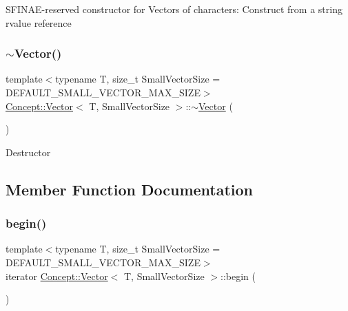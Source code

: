 S\+F\+I\+N\+A\+E-\/reserved constructor for Vectors of characters\+: Construct from a string rvalue reference \mbox{\label{class_concept_1_1_vector_a196f6eef1b0d3c04955d71d597e37c6f}} 
\subsubsection{\texorpdfstring{$\sim$Vector()}{~Vector()}}
{\footnotesize\ttfamily template$<$typename T, size\+\_\+t Small\+Vector\+Size = D\+E\+F\+A\+U\+L\+T\+\_\+\+S\+M\+A\+L\+L\+\_\+\+V\+E\+C\+T\+O\+R\+\_\+\+M\+A\+X\+\_\+\+S\+I\+ZE$>$ \\
\mbox{\hyperlink{class_concept_1_1_vector}{Concept\+::\+Vector}}$<$ T, Small\+Vector\+Size $>$\+::$\sim$\mbox{\hyperlink{class_concept_1_1_vector}{Vector}} (\begin{DoxyParamCaption}{ }\end{DoxyParamCaption})\hspace{0.3cm}{\ttfamily [inline]}}

Destructor 

\subsection{Member Function Documentation}
\mbox{\label{class_concept_1_1_vector_a118524e2ff65811ad0ad425153651a1f}} 
\subsubsection{\texorpdfstring{begin()}{begin()}\hspace{0.1cm}{\footnotesize\ttfamily [1/2]}}
{\footnotesize\ttfamily template$<$typename T, size\+\_\+t Small\+Vector\+Size = D\+E\+F\+A\+U\+L\+T\+\_\+\+S\+M\+A\+L\+L\+\_\+\+V\+E\+C\+T\+O\+R\+\_\+\+M\+A\+X\+\_\+\+S\+I\+ZE$>$ \\
iterator \mbox{\hyperlink{class_concept_1_1_vector}{Concept\+::\+Vector}}$<$ T, Small\+Vector\+Size $>$\+::begin (\begin{DoxyParamCaption}{ }\end{DoxyParamCaption})\hspace{0.3cm}{\ttfamily [inline]}}

